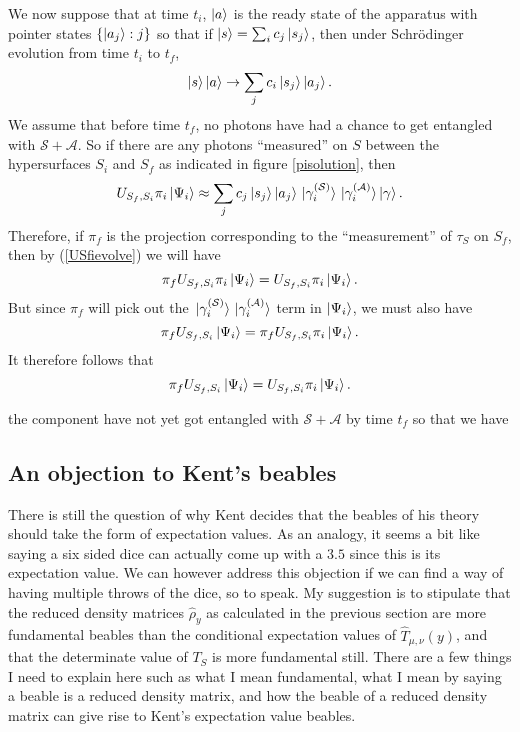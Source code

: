  We now suppose that at time $t_i$, $\ket{a}$ is the ready state of the apparatus with pointer states $\{\ket{a_j}:j\}$ so that if $\ket{s}=\sum_i c_j\ket{s_j}$, then under Schr\"{o}dinger evolution from time $t_i$ to $t_f$,
 $$\ket{s}\ket{a}\rightarrow\sum_j c_i\ket{s_j}\ket{a_j}.$$
 We assume that before time $t_f$, no photons have had a chance to get entangled with $\mathcal{S}+\mathcal{A}$. So if there are any photons ``measured'' on $S$ between the hypersurfaces $S_i$ and $S_f$ as indicated in figure \ref{pisolution}, then 
\begin{equation}\label{USfievolve}
	U_{S_f,S_i}\pi_{i}\ket{\Psi_{i}}\approx \sum_j c_j\ket{s_j}\ket{a_j}\ket*{\gamma_i^{(\mathcal{S})}}\ket*{\gamma_i^{(\mathcal{A})}}\ket{\gamma}.
\end{equation}
Therefore, if $\pi_f$ is the projection corresponding to the ``measurement'' of $\tau_S$ on $S_f$, then by (\ref{USfievolve}) we will have
$$\pi_f U_{S_f,S_i}\pi_{i}\ket{\Psi_{i}} = U_{S_f,S_i}\pi_{i}\ket{\Psi_{i}}. $$
But since $\pi_f$ will pick out the $\ket*{\gamma_i^{(\mathcal{S})}}\ket*{\gamma_i^{(\mathcal{A})}}$ term in $\ket{\Psi_i}$, we must also have 
$$ \pi_f U_{S_f,S_i}\ket{\Psi_{i}}= \pi_f U_{S_f,S_i}\pi_{i}\ket{\Psi_{i}}.$$
 It therefore follows that 
 $$\pi_f U_{S_f,S_i}\ket{\Psi_{i}}=U_{S_f,S_i}\pi_{i}\ket{\Psi_{i}}.$$


 the component  have not yet got entangled with $\mathcal{S}+\mathcal{A}$ by time $t_f$ so that we have

 



\subsection{An objection to Kent's beables}


There is still the question of why Kent decides that the beables of his theory should take the form of expectation values. As an analogy, it seems a bit like saying a six sided dice can actually come up with a $3.5$ since this is its expectation value. We can however address this objection if we can find a way of having multiple throws of the dice, so to speak. My suggestion is to stipulate that the reduced density matrices $\hat{\rho}_y$ as calculated in the previous section are more fundamental beables than the conditional expectation values of $\hat{T}_{\mu,\nu}(y)$, and that the determinate value of $T_S$ is more fundamental still. There are a few things I need to explain here such as what I mean fundamental, what I mean by saying a beable is a reduced density matrix, and how the beable of a reduced density matrix can give rise to Kent's expectation value beables.

